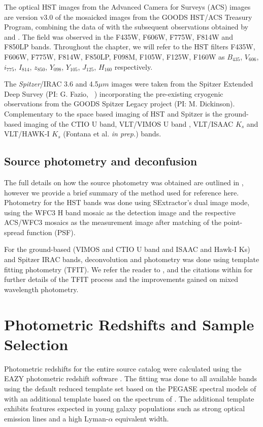 The optical HST images from the Advanced Camera for Surveys (ACS) images are version v3.0 of the mosaicked images from the GOODS HST/ACS Treasury Program, combining the data of \citet{2004ApJ...600L..93G} with the subsequent observations obtained by \citet{2006AJ....132.1729B} and \citep{Koekemoer:2011br}. The field was observed in the F435W, F606W, F775W, F814W and F850LP bands. Throughout the chapter, we will refer to the HST filters F435W, F606W, F775W, F814W, F850LP, F098M, F105W, F125W, F160W as $B_{435}$, $V_{606}$, $i_{775}$, $I_{814}$, $z_{850}$, $Y_{098}$, $Y_{105}$, $J_{125}$, $H_{160}$ respectively. 

The \emph{Spitzer}/IRAC \citep{Fazio:2004eb} 3.6 and 4.5$\mu m$ images were taken from the Spitzer Extended Deep Survey (PI: G. Fazio, \citeauthor{Ashby:2013cc}~\citeyear{Ashby:2013cc}) incorporating the pre-existing cryogenic observations from the GOODS Spitzer Legacy project (PI: M. Dickinson). Complementary to the space based imaging of HST and Spitzer is the ground-based imaging of the CTIO U band, VLT/VIMOS U band \citep{Nonino:2009hf}, VLT/ISAAC $K_{s}$ \citep{Retzlaff:2010co} and VLT/HAWK-I $K_{s}$ (Fontana et al. \emph{in prep.}) bands.

\subsection{Source photometry and deconfusion}
The full details on how the source photometry was obtained are outlined in \citet{Guo:2013ig}, however we provide a brief summary of the method used for reference here. Photometry for the HST bands was done using SExtractor's dual image mode, using the WFC3 H band mosaic as the detection image and the respective ACS/WFC3 mosaics as the measurement image after matching of the point-spread function (PSF). 

For the ground-based (VIMOS and CTIO U band and ISAAC and Hawk-I Ks) and Spitzer IRAC bands, deconvolution and photometry was done using template fitting photometry (TFIT). We refer the reader to \citet{Laidler:2007iy}, \citet{2012ApJ...752...66L} and the citations within for further details of the TFIT process and the improvements gained on mixed wavelength photometry.

\section{Photometric Redshifts and Sample Selection}\label{smf-sec:redshift}
Photometric redshifts for the entire source catalog were calculated using the EAZY photometric redshift software \citep{Brammer:2008gn}. The fitting was done to all available bands using the default reduced template set based on the PEGASE spectral models of \citet{1997A&A...326..950F} with an additional template based on the spectrum of \citet{2010ApJ...719.1168E}. The additional template exhibits features expected in young galaxy populations such as strong optical emission lines and a high Lyman-$\alpha$ equivalent width.

